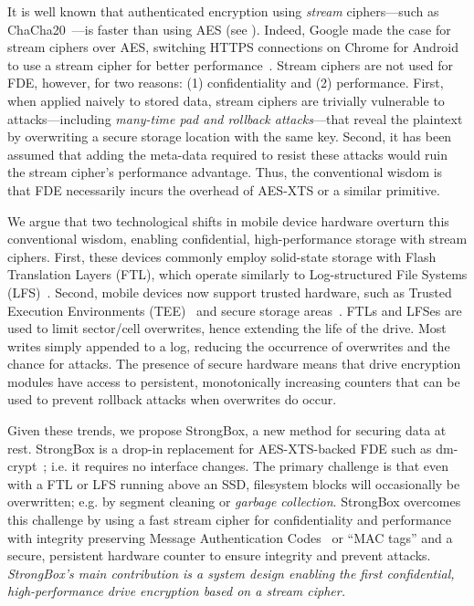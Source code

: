 It is well known that authenticated encryption using \emph{stream}
ciphers---such as ChaCha20~\cite{ChaCha20}---is faster than using AES (see
). Indeed, Google made the case for stream ciphers over AES,
switching HTTPS connections on Chrome for Android to use a stream cipher for
better performance~\cite{google-blog}. Stream ciphers are not used for FDE,
however, for two reasons: (1) confidentiality and (2) performance. First, when
applied naively to stored data, stream ciphers are trivially vulnerable to
attacks---including \emph{many-time pad and rollback attacks}---that reveal the
plaintext by overwriting a secure storage location with the same key. Second, it
has been assumed that adding the meta-data required to resist these attacks
would ruin the stream cipher's performance advantage. Thus, the conventional
wisdom is that FDE necessarily incurs the overhead of AES-XTS or a similar
primitive.

We argue that two technological shifts in mobile device hardware overturn this
conventional wisdom, enabling confidential, high-performance storage with stream
ciphers. First, these devices commonly employ solid-state storage with Flash
Translation Layers (FTL), which operate similarly to Log-structured File Systems
(LFS)~\cite{LFS,F2FS,NILFS}. Second, mobile devices now support trusted
hardware, such as Trusted Execution Environments (TEE)~\cite{TEE,TrustZone} and
secure storage areas~\cite{eMMC-standard}. FTLs and LFSes are used to limit
sector/cell overwrites, hence extending the life of the drive. Most writes
simply appended to a log, reducing the occurrence of overwrites and the chance
for attacks. The presence of secure hardware means that drive encryption modules
have access to persistent, monotonically increasing counters that can be used to
prevent rollback attacks when overwrites do occur.

Given these trends, we propose StrongBox, a new method for securing data at
rest. StrongBox is a drop-in replacement for AES-XTS-backed FDE such as
dm-crypt~\cite{dmcrypt}; i.e. it requires no interface changes. The primary
challenge is that even with a FTL or LFS running above an SSD, filesystem blocks
will occasionally be overwritten; e.g. by segment cleaning or \emph{garbage
collection}. StrongBox overcomes this challenge by using a fast stream cipher
for confidentiality and performance with integrity preserving Message
Authentication Codes~\cite{MAC} or ``MAC tags'' and a secure, persistent
hardware counter to ensure integrity and prevent attacks. \emph{StrongBox's main
contribution is a system design enabling the first confidential,
high-performance drive encryption based on a stream cipher.}
